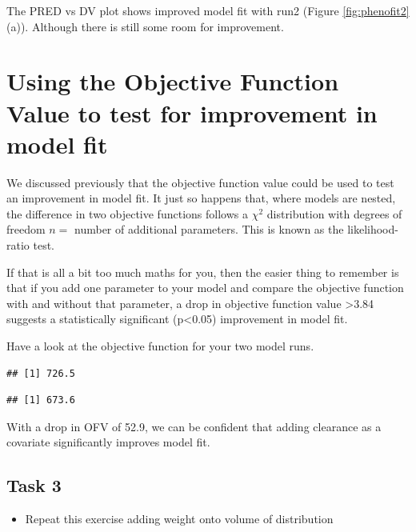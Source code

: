 \documentclass[
]{article}
\newenvironment{Shaded}{\begin{snugshade}}{\end{snugshade}}
\newcommand{\NormalTok}[1]{#1}
\newcommand{\SpecialCharTok}[1]{\textcolor[rgb]{0.81,0.36,0.00}{\textbf{#1}}}
\providecommand{\tightlist}{%
  \setlength{\itemsep}{0pt}\setlength{\parskip}{0pt}}
\begin{document}
The PRED vs DV plot shows improved model fit with run2 (Figure \ref{fig:phenofit2} (a)). Although there is still some room for improvement.

\section{Using the Objective Function Value to test for improvement in model fit}\label{using-the-objective-function-value-to-test-for-improvement-in-model-fit}

We discussed previously that the objective function value could be used to test an improvement in model fit. It just so happens that, where models are nested, the difference in two objective functions follows a \(\chi^2\) distribution with degrees of freedom \(n=\) number of additional parameters. This is known as the likelihood-ratio test.

If that is all a bit too much maths for you, then the easier thing to remember is that if you add one parameter to your model and compare the objective function with and without that parameter, a drop in objective function value \textgreater3.84 suggests a statistically significant (p\textless0.05) improvement in model fit.

Have a look at the objective function for your two model runs.

\begin{Shaded}
\end{Shaded}

\begin{verbatim}
## [1] 726.5
\end{verbatim}

\begin{verbatim}
## [1] 673.6
\end{verbatim}

With a drop in OFV of 52.9, we can be confident that adding clearance as a covariate significantly improves model fit.

\subsection{Task 3}\label{task-3}

\begin{itemize}
\tightlist
\item
  Repeat this exercise adding weight onto volume of distribution
\end{itemize}
\end{document}
